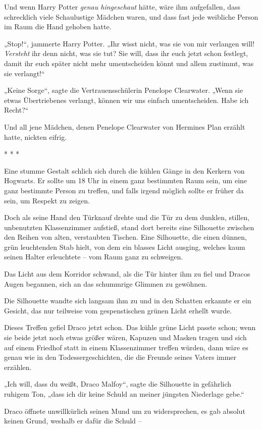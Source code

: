 {Und wenn Harry Potter \emph{genau hingeschaut} hätte, wäre ihm aufgefallen, dass schrecklich viele Schaulustige Mädchen waren, und dass fast jede weibliche Person im Raum die Hand gehoben hatte.

„Stop!“, jammerte Harry Potter. „Ihr wisst nicht, was sie von mir verlangen will! \emph{Versteht} ihr denn nicht, was sie tut? Sie will, dass ihr euch jetzt schon festlegt, damit ihr euch später nicht mehr umentscheiden könnt und allem zustimmt, was sie verlangt!“

„Keine Sorge“, sagte die Vertrauensschülerin Penelope Clearwater. „Wenn sie etwas Übertriebenes verlangt, können wir uns einfach umentscheiden. Habe ich Recht?“

Und all jene Mädchen, denen Penelope Clearwater von Hermines Plan erzählt hatte, nickten eifrig.

* * *

Eine stumme Gestalt schlich sich durch die kühlen Gänge in den Kerkern von Hogwarts. Er sollte um 18 Uhr in einem ganz bestimmten Raum sein, um eine ganz bestimmte Person zu treffen, und falls irgend möglich sollte er früher da sein, um Respekt zu zeigen.

Doch als seine Hand den Türknauf drehte und die Tür zu dem dunklen, stillen, unbenutzten Klassenzimmer aufstieß, stand dort bereits eine Silhouette zwischen den Reihen von alten, verstaubten Tischen. Eine Silhouette, die einen dünnen, grün leuchtenden Stab hielt, von dem ein blasses Licht ausging, welches kaum seinen Halter erleuchtete -- vom Raum ganz zu schweigen.

Das Licht aus dem Korridor schwand, als die Tür hinter ihm zu fiel und Dracos Augen begannen, sich an das schummrige Glimmen zu gewöhnen.

Die Silhouette wandte sich langsam ihm zu und in den Schatten erkannte er ein Gesicht, das nur teilweise vom gespenstischen grünen Licht erhellt wurde.

Dieses Treffen gefiel Draco jetzt schon. Das kühle grüne Licht passte schon; wenn sie beide jetzt noch etwas größer wären, Kapuzen und Masken tragen und sich auf einem Friedhof statt in einem Klassenzimmer treffen würden, dann wäre es genau wie in den Todessergeschichten, die die Freunde seines Vaters immer erzählen.

„Ich will, dass du weißt, Draco Malfoy“, sagte die Silhouette in gefährlich ruhigem Ton, „dass ich dir keine Schuld an meiner jüngsten Niederlage gebe.“

Draco öffnete unwillkürlich seinen Mund um zu widersprechen, es gab absolut keinen Grund, weshalb er dafür die Schuld --

}

